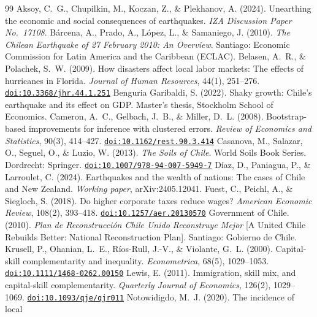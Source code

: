 \documentclass[12pt]{article}
\newcommand{\doi}[1]{\href{https://doi.org/#1}{\texttt{doi:#1}}}
\begin{document}
\clearpage
\begin{thebibliography}{99}
 Aksoy, C.~G., Chupilkin, M., Koczan, Z., \& Plekhanov, A.
(2024). Unearthing the economic and social consequences of earthquakes. \textit{IZA Discussion
Paper No.\ 17108}.
 B\'arcena, A., Prado, A., L\'opez, L., \& Samaniego, J. (2010). \textit{The Chilean
Earthquake of 27 February 2010: An Overview}. Santiago: Economic Commission for Latin America and
the Caribbean (ECLAC).
 Belasen, A.~R., \& Polachek, S.~W. (2009). How
disasters affect local labor markets: The effects of hurricanes in Florida. \textit{Journal of
Human Resources}, 44(1), 251--276. \doi{10.3368/jhr.44.1.251}
 Benguria Garibaldi, S. (2022). Shaky growth: Chile's
earthquake and its effect on GDP. Master's thesis, Stockholm School of Economics.
 Cameron, A.~C., Gelbach, J.~B., \& Miller, D.~L.
(2008). Bootstrap-based improvements for inference with clustered errors. \textit{Review of
Economics and Statistics}, 90(3), 414--427. \doi{10.1162/rest.90.3.414}
 Casanova, M., Salazar, O., Seguel, O., \& Luzio, W.
(2013). \textit{The Soils of Chile}. World Soils Book Series. Dordrecht: Springer.
\doi{10.1007/978-94-007-5949-7}
 D\'iaz, D., Paniagua, P., \& Larroulet, C. (2024).
Earthquakes and the wealth of nations: The cases of Chile and New Zealand. \textit{Working
paper}, arXiv:2405.12041.
 Fuest, C., Peichl, A., \& Siegloch, S. (2018). Do
higher corporate taxes reduce wages? \textit{American Economic Review}, 108(2), 393--418.
\doi{10.1257/aer.20130570}
 Government of Chile. (2010). \textit{Plan de
Reconstrucci\'on Chile Unido Reconstruye Mejor} [A United Chile Rebuilds Better: National Reconstruction Plan]. Santiago: Gobierno de Chile.
 Krusell, P., Ohanian, L.~E., R\'ios-Rull, J.-V.,
\& Violante, G.~L. (2000). Capital-skill complementarity and inequality.
\textit{Econometrica}, 68(5), 1029--1053. \doi{10.1111/1468-0262.00150}
 Lewis, E. (2011). Immigration, skill mix, and capital-skill
complementarity. \textit{Quarterly Journal of Economics}, 126(2), 1029--1069.
\doi{10.1093/qje/qjr011}
 Notowidigdo, M.~J. (2020). The incidence of local

\end{thebibliography}
\end{document}
